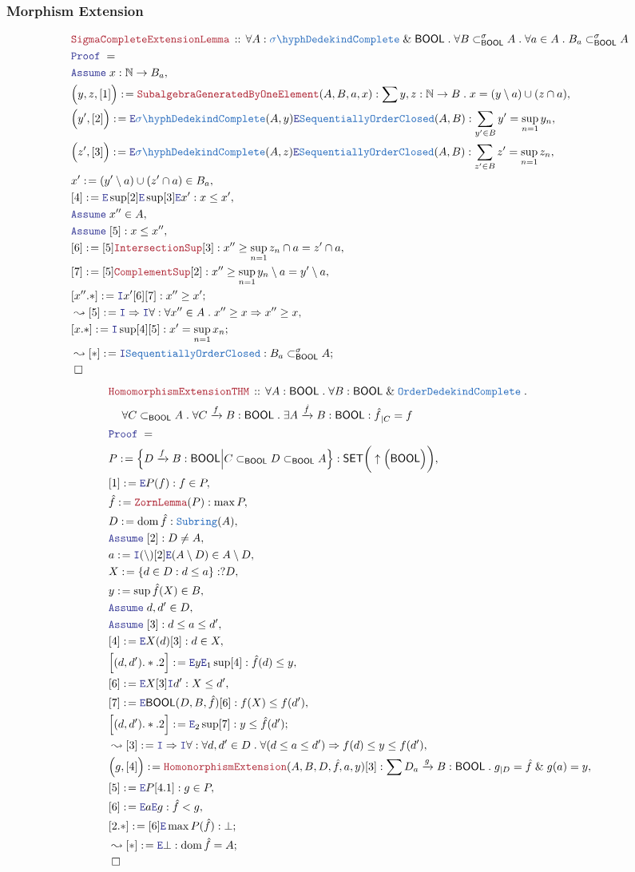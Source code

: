 \documentclass[12pt]{scrartcl}
\newcommand{\TYPE}[1]{\textcolor{NavyBlue}{\mathtt{#1}}}
\newcommand{\LOGIC}[1]{\textcolor{Blue}{\mathtt{#1}}}
\newcommand{\THM}[1]{\textcolor{Maroon}{\mathtt{#1}}}
\renewcommand{\.}{\; . \;}
\newcommand{\de}{: \kern 0.1pc =}
\newcommand{\Theorem}[2]{& \THM{#1} \, :: \, #2 \\ & \Proof = \\ }
\newcommand{\NewLine}{\\ & \kern 1pc}
\newcommand{\Page}[1]{ \begin{align*} #1 \end{align*}   }
\renewcommand{\And}{\; \& \;}
\newcommand{\Imply}{\Rightarrow}
\newcommand{\Intro}{\LOGIC{I}}
\newcommand{\Elim}{\LOGIC{E}}
\newcommand{\Nat}{\mathbb{N} }
\newcommand{\Arrow}{\xrightarrow}
\newcommand{\Say}[3]{& #1 \de #2 : #3, \\}
\newcommand{\SayIn}[3]{& #1 \de #2 \in #3, \\}
\newcommand{\Conclude}[3]{& #1 \de #2 : #3; \\}
\newcommand{\Derive}[3]{& \leadsto #1 \de #2 : #3, \\}
\newcommand{\DeriveConclude}[3]{& \leadsto #1 \de #2 : #3 ; \\}
\newcommand{\Assume}[2]{& \LOGIC{Assume} \; #1 : #2, \\}
\newcommand{\AssumeIn}[2]{& \LOGIC{Assume} \; #1 \in #2, \\}
\newcommand{\QED}{\; \square}
\newcommand{\EndProof}{& \QED \\}
\newcommand{\Proof}{\LOGIC{Proof} \; }
\DeclareMathOperator*{\dom}{dom}
\newcommand{\SET}{\mathsf{SET}}
\newcommand{\SOC}{\TYPE{SequentiallyOrderClosed}}
\newcommand{\OComplete}{\TYPE{OrderDedekindComplete}}
\newcommand{\SComplete}{\TYPE{\sigma\hyph DedekindComplete}}
\newcommand{\BOOL}{\mathsf{BOOL}}
\begin{document}
\subsubsection{Morphism Extension}
\Page{
	\Theorem{SigmaCompleteExtensionLemma}
	{
		\forall A : \SComplete \And \BOOL \.
		\forall B \subset_\BOOL^\sigma A \.
		\forall a \in A \.
		B_a \subset_\BOOL^\sigma A
	}
	\Assume{x}{\Nat \to B_a}
	\Say{\Big(y,z,[1]\Big)}
	{
		\THM{SubalgebraGeneratedByOneElement}(A,B,a,x)
	}
	{
		\sum y,z : \Nat \to B \.
		x = (y \setminus a) \cup (z \cap a)
	}
	\Say{\Big(y',[2]\Big)}{ \Elim \SComplete (A,y) \Elim \SOC(A,B)   }
	{
		\sum_{y' \in B}  y' = \sup_{n=1} y_n 
	}
	\Say{\Big(z',[3]\Big)}{ \Elim \SComplete (A,z) \Elim \SOC(A,B)   }
	{
		\sum_{z' \in B}  z' = \sup_{n=1} z_n 
	}
	\SayIn{x'}{(y'\setminus a) \cup (z' \cap a)}{B_a}
	\Say{[4]}{\Elim \sup [2] \Elim \sup [3]\Elim x'}
	{  x \le x'  }
	\AssumeIn{x''}{A}
	\Assume{[5]}{x \le x''}
	\Say{[6]}{[5]\THM{IntersectionSup}[3]}{x'' \ge \sup_{n=1} z_n \cap a   = z' \cap a}
	\Say{[7]}{[5] \THM{ComplementSup}[2] }{x'' \ge \sup_{n=1} y_n \setminus a =  y' \setminus a}
	\Conclude{[x''.*]}{\Intro x' [6][7]}{x'' \ge x'}
	\Derive{[5]}{\Intro \Imply \Intro \forall }
	{
		\forall x'' \in A \. x'' \ge x \Imply x'' \ge x
	}
	\Conclude{[x.*]}{\Intro \sup [4][5]}{x' = \sup_{n=1} x_n}
	\DeriveConclude{[*]}{\Intro \SOC }{B_a \subset_\BOOL^\sigma A}
	\EndProof
}\Page{
	\Theorem{HomomorphismExtensionTHM}
	{
		\forall A  : \BOOL \. 
		\forall B  : \BOOL \And \OComplete \.
		\NewLine
		\forall C \subset_\BOOL A \.
		\forall C \Arrow{f} B : \BOOL \.
		\exists A \Arrow{\hat f} B : \BOOL :
		{\hat f}_{|C} = f
	}
	\Say{P}{ 
		\Big\{  
			D \Arrow{f} B   : \BOOL \Big| 
			C \subset_\BOOL D \subset_\BOOL A 
		\Big\}   
	}
	{
		\SET\bigg(\uparrow\Big( \BOOL \Big) \bigg) 
	}
	\Say{[1]}{\Elim P (f)}{f \in P}
	\Say{\hat f}{\THM{ZornLemma}(P)}
	{
		\max P	
	}
	\Say{D}{\dom \hat f}{\TYPE{Subring}(A)}
	\Assume{[2]}{D \neq A}
	\SayIn{a}{\Intro (\setminus)[2] \Elim (A \setminus D)}{A \setminus D}
	\Say{X}{ \{ d \in D :  d \le a   \}  }{?D}
	\SayIn{y}{ \sup \hat f(X)}{B}
	\AssumeIn{d,d'}{D}
	\Assume{[3]}{d \le a \le d'}
	\Say{[4]}{\Elim X (d) [3] }{ d \in X  }
	\Say{\Big[(d,d').*.2\Big]}{\Elim y \Elim_1 \sup [4]}{  \hat f(d) \le y  }
	\Say{[6]}{\Elim X [3]\Intro d'}{ X \le d'}
	\Say{[7]}{\Elim \BOOL(D,B,\hat f)[6]}{f(X) \le f(d')}
	\Conclude{\Big[(d,d').*.2\Big]}{\Elim_2 \sup [7]}{ y \le \hat f(d')   }
	\Derive{[3]}{\Intro \Imply \Intro \forall}
	{
		\forall d,d' \in D \.
		\forall 
		(d \le a \le d')
		\Imply
		f(d) \le y \le f(d')
	}
	\Say{\Big( g ,[4]\Big)}{\THM{HomonorphismExtension}(A,B,D,\hat f,a,y)[3]}
	{
		\sum D_a \Arrow{g} B : \BOOL \. g_{|D} = \hat f \And g(a) = y
	}
	\Say{[5]}{\Elim P [4.1]}{g \in P}
	\Say{[6]}{\Elim a \Elim g}{\hat f < g}
	\Conclude{[2.*]}{[6]\Elim \max P(\hat f)}{\bot}
	\DeriveConclude{[*]}{\Elim \bot  }{ \dom \hat f = A}
	\EndProof
}
\newpage
\end{document}
